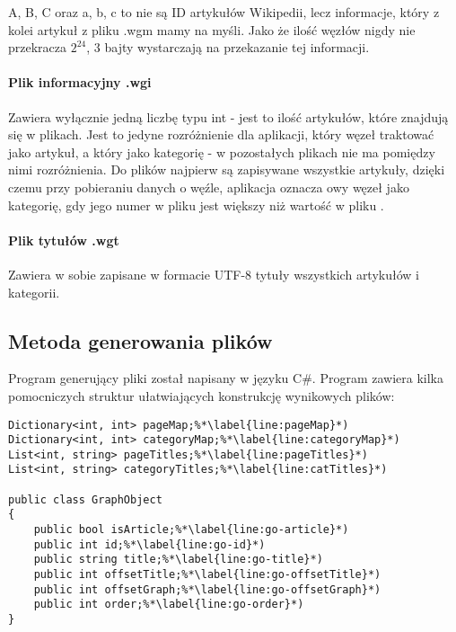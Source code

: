 
A, B, C oraz a, b, c to nie są ID artykułów Wikipedii, lecz informacje, który z kolei artykuł z pliku .wgm mamy na myśli. Jako że ilość węzłów nigdy nie przekracza $2^{24}$, 3 bajty wystarczają na przekazanie tej informacji.

\paragraph{Plik informacyjny .wgi}

Zawiera wyłącznie jedną liczbę typu int - jest to ilość artykułów, które znajdują się w plikach. Jest to jedyne rozróżnienie dla aplikacji, który węzeł traktować jako artykuł, a który jako kategorię - w pozostałych plikach nie ma pomiędzy nimi rozróżnienia. Do plików najpierw są zapisywane wszystkie artykuły, dzięki czemu przy pobieraniu danych o węźle, aplikacja oznacza owy węzeł jako kategorię, gdy jego numer w pliku  jest większy niż wartość w pliku . 

\paragraph{Plik tytułów .wgt}

Zawiera w sobie zapisane w formacie UTF-8 tytuły wszystkich artykułów i kategorii.

\subsection{Metoda generowania plików}

Program generujący pliki  został napisany w języku C\#.
Program zawiera kilka pomocniczych struktur ułatwiających konstrukcję wynikowych plików:

\begin{lstlisting}[caption={Pomocnicze struktury dla programu generującego pliki dla aplikacji}, label=lst:graph-object]
Dictionary<int, int> pageMap;%*\label{line:pageMap}*)
Dictionary<int, int> categoryMap;%*\label{line:categoryMap}*)
List<int, string> pageTitles;%*\label{line:pageTitles}*)
List<int, string> categoryTitles;%*\label{line:catTitles}*)

public class GraphObject
{
    public bool isArticle;%*\label{line:go-article}*)
    public int id;%*\label{line:go-id}*)
    public string title;%*\label{line:go-title}*)
    public int offsetTitle;%*\label{line:go-offsetTitle}*)
    public int offsetGraph;%*\label{line:go-offsetGraph}*)
    public int order;%*\label{line:go-order}*)
}
\end{lstlisting}

